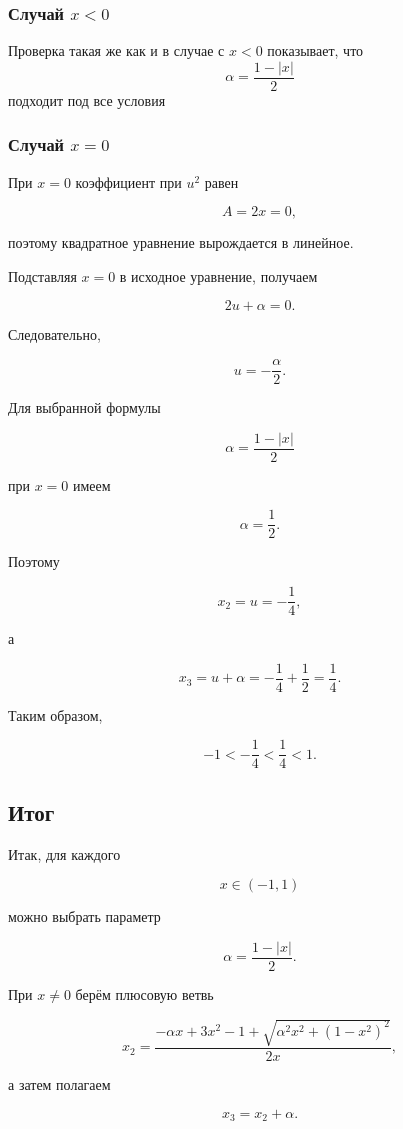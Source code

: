 \documentclass[12pt,a4paper]{article}
\begin{document}
	\subsubsection{Случай $x<0$}
	Проверка такая же как и в случае с $x<0$ показывает, что
	\[
	\alpha = \frac{1-|x|}{2}
	\]
	подходит под все условия
	
	\subsubsection{Случай $x=0$}
	
	При $x=0$ коэффициент при $u^2$ равен
	
	$$
	A=2x=0,
	$$
	
	поэтому квадратное уравнение вырождается в линейное.
	
	Подставляя $x=0$ в исходное уравнение, получаем
	
	$$
	2u+\alpha=0.
	$$
	
	Следовательно,
	
	$$
	u=-\frac{\alpha}{2}.
	$$
	
	Для выбранной формулы
	
	$$
	\alpha=\frac{1-|x|}{2}
	$$
	
	при $x=0$ имеем
	
	$$
	\alpha=\frac12.
	$$
	
	Поэтому
	
	$$
	x_2=u=-\frac14,
	$$
	
	а
	
	$$
	x_3=u+\alpha
	=
	-\frac14+\frac12
	=
	\frac14.
	$$
	
	Таким образом,
	
	$$
	\boxed{
		-1<-\frac14<\frac14<1.
	}
	$$
	
	\subsection{Итог}
	
	Итак, для каждого
	
	$$
	\boxed{x\in(-1,1)}
	$$
	
	можно выбрать параметр
	
	$$
	\boxed{
		\alpha=\frac{1-|x|}{2}.
	}
	$$
	
	При $x\neq0$ берём плюсовую ветвь
	
	$$
	\boxed{
		x_2=
		\frac{
			-\alpha x+3x^2-1+
			\sqrt{\alpha^2x^2+(1-x^2)^2}
		}{2x},
	}
	$$
	
	а затем полагаем
	
	$$
	\boxed{
		x_3=x_2+\alpha.
	}
	$$
	
\end{document}
